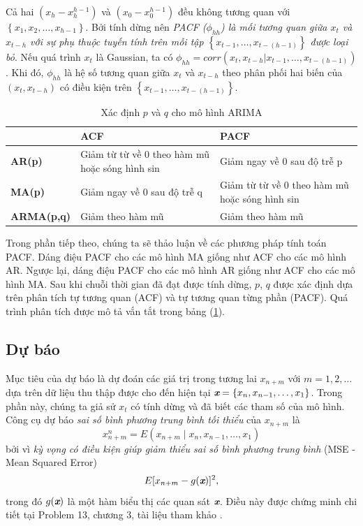 \documentclass[12pt, a4paper,oneside]{book}
\theoremstyle{definition}
\begin{document}
Cả hai $(x_h-x_h^{h-1})$ và $(x_0-x_0^{h-1})$ đều không tương quan với $\left\lbrace x_1, x_2, \dots, x_{h-1}\right\rbrace$. Bởi tính dừng nên \textit{PACF ($\phi_{hh}$) là mối tương quan giữa $x_t$ và $x_{t-h}$ với sự phụ thuộc tuyến tính trên mỗi tập $\left\lbrace x_{t-1},\dots, x_{t-(h-1)}\right\rbrace$ được loại bỏ}. Nếu quá trình $x_t$ là Gaussian, ta có $\phi_{hh}=corr(x_t, x_{t-h}| x_{t-1}, \dots, x_{t-(h-1)})$. Khi đó, $\phi_{hh}$ là hệ số tương quan giữa $x_t$ và $x_{t-h}$ theo phân phối hai biến của $(x_t,x_{t-h})$ có điều kiện trên $\left\lbrace x_{t-1}, \dots, x_{t-(h-1)}\right\rbrace$.
\begin{table}[h!]
	\centering
	\caption{Xác định $p$ và $q$ cho mô hình ARIMA}
	\begin{tabular}{|p{2.5cm}|p{6cm}|p{6cm}|}
		\hline 
		&\textbf{ACF }&\textbf{PACF }\\
		\hline
		\textbf{AR(p)} &Giảm từ từ về 0 theo hàm mũ hoặc sóng hình sin & Giảm ngay về 0 sau độ trễ p\\
		\hline
		\textbf{MA(p)} &Giảm ngay về 0 sau độ trễ q &Giảm từ từ về 0 theo hàm mũ hoặc sóng hình sin \\
		\hline
		\textbf{ARMA(p,q)} &Giảm theo hàm mũ &Giảm theo hàm mũ \\
		\hline
	\end{tabular}
	\label{x1} 
\end{table}

Trong phần tiếp theo, chúng ta sẽ thảo luận về các phương pháp tính toán PACF. Dáng điệu PACF cho các mô hình MA giống như ACF cho các mô hình AR. Ngược lại, dáng điệu PACF cho các mô hình AR giống như ACF cho các mô hình MA. Sau khi chuỗi thời gian đã đạt được tính dừng, $p$, $q$ được xác định dựa trên phân tích tự tương quan (ACF) và tự tương quan từng phần (PACF). Quá trình phân tích được mô tả vắn tắt trong bảng (\ref{x1}).

\subsection{\label{db}Dự báo}
Mục tiêu của dự báo là dự đoán các giá trị trong tương lai $x_{n+m}$ với $m =1, 2,\dots$ dựa trên dữ liệu thu thập được cho đến hiện tại $\textit{\textbf{x}} = \left\lbrace x_{n}, x_{n-1},\dots, x_{1}\right\rbrace$. Trong phần này, chúng ta giả sử $x_t$ có tính dừng và đã biết các tham số của mô hình. Công cụ dự báo \textit{sai số bình phương trung bình tối thiểu} của $x_{n+m}$ là 
$$x_{n+m}^n= E(x_{n+m}\mid x_{n}, x_{n-1}, \dots, x_{1})$$ bởi vì \textit{kỳ vọng có điều kiện giúp giảm thiểu sai số bình phương trung bình} (MSE - Mean Squared Error)
\begin{equation}
E[x_{n+m} - g(\textit{\textbf{x}})]^2, \label{ct1.133}
\end{equation}
trong đó $g(\textit{\textbf{x}})$ là một hàm biểu thị các quan sát $\textit{\textbf{x}}$. Điều này được chứng minh chi tiết tại Problem 13, chương 3, tài liệu tham khảo \cite{8}.
\end{document}
